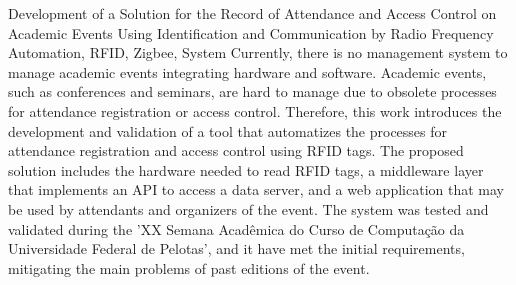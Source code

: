 \documentclass[tcc,capa]{texufpel}
\begin{document}
\begin{abstract}

Atualmente, não existe um sistema  para gerenciamento de eventos acadêmicos que integre eficientemente hardware/software. Eventos acadêmicos como congressos e semanas acadêmicas, cada vez mais vem tornando-se cansativos e inviáveis por conta de processos obsoletos de registro de presenças e controle de acesso.

Portanto, esse trabalho de conclusão de curso apresenta o desenvolvimento e validação de uma ferramenta automatizada para o registro de presenças e controle de acesso utilizando RFID (Identificação por Radiofrequência).
A solução proposta inclui o hardware necessário para fazer a leitura de etiquetas RFID, uma camada de middleware que implementa uma API para comunicação com o servidor de dados e, também, uma aplicação web com perfis para participantes e organizadores do evento.

O sistema foi validado e testado na XX Semana Acadêmica do Curso de Computação da Universidade Federal de Pelotas e acredita-se que os objetivos da proposta foram cumpridos, sanando os principais problemas apontados em edições anteriores do evento.

\end{abstract}

\begin{englishabstract}
  {Development of a Solution for the Record of Attendance and Access Control on Academic Events Using Identification and Communication by Radio Frequency}
 {Automation, RFID, Zigbee, System}
   Currently, there is no management system to manage academic events integrating hardware and software. Academic events, such as conferences and seminars, are hard to manage due to obsolete processes for attendance registration or access control.
Therefore, this work introduces the development and validation of a tool that automatizes the processes for attendance registration and access control using RFID tags.
The proposed solution includes the hardware needed to read RFID tags, a middleware layer that implements an API to access a data server, and a web application that may be used by attendants and organizers of the event.
The system was tested and validated during the 'XX Semana Acadêmica do Curso de Computação da Universidade Federal de Pelotas', and it have met the initial requirements, mitigating the main problems of past editions of the event.
\end{englishabstract}

\listoffigures
\end{document}
